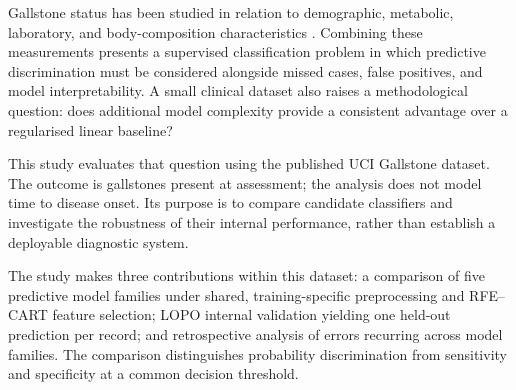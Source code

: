 Gallstone status has been studied in relation to demographic, metabolic, laboratory, and body-composition characteristics \parencite{lammert2016gallstones,esen2024early}. Combining these measurements presents a supervised classification problem in which predictive discrimination must be considered alongside missed cases, false positives, and model interpretability. A small clinical dataset also raises a methodological question: does additional model complexity provide a consistent advantage over a regularised linear baseline?

This study evaluates that question using the published UCI Gallstone dataset. The outcome is gallstones present at assessment; the analysis does not model time to disease onset. Its purpose is to compare candidate classifiers and investigate the robustness of their internal performance, rather than establish a deployable diagnostic system.

The study makes three contributions within this dataset: a comparison of five predictive model families under shared, training-specific preprocessing and RFE--CART feature selection; LOPO internal validation yielding one held-out prediction per record; and retrospective analysis of errors recurring across model families. The comparison distinguishes probability discrimination from sensitivity and specificity at a common decision threshold.
